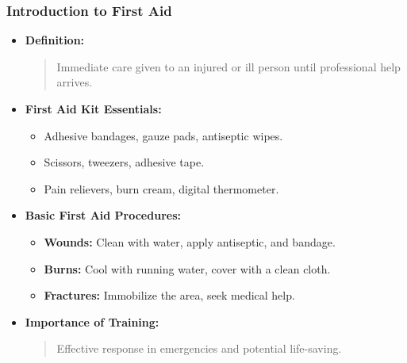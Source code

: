 \begin{frame}[fragile]\frametitle{Introduction to First Aid}

      \begin{itemize}
        \item \textbf{Definition:} 
        \begin{quote}
        Immediate care given to an injured or ill person until professional help arrives.
        \end{quote}
        \item \textbf{First Aid Kit Essentials:} 
        \begin{itemize}
            \item Adhesive bandages, gauze pads, antiseptic wipes.
            \item Scissors, tweezers, adhesive tape.
            \item Pain relievers, burn cream, digital thermometer.
        \end{itemize}
        \item \textbf{Basic First Aid Procedures:} 
        \begin{itemize}
            \item \textbf{Wounds:} Clean with water, apply antiseptic, and bandage.
            \item \textbf{Burns:} Cool with running water, cover with a clean cloth.
            \item \textbf{Fractures:} Immobilize the area, seek medical help.
        \end{itemize}
        \item \textbf{Importance of Training:} 
        \begin{quote}
        Effective response in emergencies and potential life-saving.
        \end{quote}
      \end{itemize}

\end{frame}


